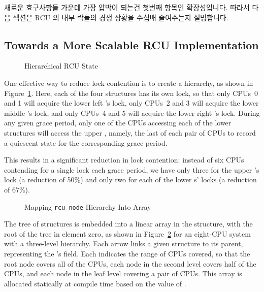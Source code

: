 새로운 효구사항들 가운데 가장 압박이 되는건 첫번째 항목인 확장성입니다.
따라서 다음 섹션은 RCU 의 내부 락들의 경쟁 상황을 수십배 줄여주는지 설명합니다.
\iffalse

The most pressing of the new requirements is the first one, scalability.
The next section therefore describes how to make order-of-magnitude reductions
in contention on RCU's internal locks.
\fi

\subsection{Towards a More Scalable RCU Implementation}
\label{app:rcuimpl:rcutree:Towards a More Scalable RCU Implementation}

\begin{figure}[htb]
\centering
{}
\caption{Hierarchical RCU State}
\label{fig:app:rcuimpl:rcutree:Hierarchical RCU State}
\end{figure}

One effective way to reduce lock contention is to create a hierarchy,
as shown in
Figure~\ref{fig:app:rcuimpl:rcutree:Hierarchical RCU State}.
Here, each of the four  structures has its own lock,
so that only CPUs~0 and 1 will acquire the lower left
's lock, only CPUs~2 and 3 will acquire the
lower middle 's lock, and only CPUs~4 and 5
will acquire the lower right 's lock.
During any given grace period,
only one of the CPUs accessing each of the lower 
structures will access the upper , namely, the
last of each pair of CPUs to record a quiescent state for the corresponding
grace period.

This results in a significant reduction in lock contention:
instead of six CPUs contending for a single lock each grace period,
we have only three for the upper 's lock
(a reduction of 50\%) and only
two for each of the lower s' locks (a reduction
of 67\%).

\begin{figure}[htb]
\centering
{}
\caption{Mapping {\tt rcu\_node} Hierarchy Into Array}
\label{fig:app:rcuimpl:rcutree:Mapping rcu-node Hierarchy Into Array}
\end{figure}

The tree of  structures is embedded into
a linear array in the  structure,
with the root of the tree in element zero, as shown in
Figure~\ref{fig:app:rcuimpl:rcutree:Mapping rcu-node Hierarchy Into Array}
for an eight-CPU
system with a three-level hierarchy.
Each arrow links a given  structure to its parent,
representing the 's  field.
Each  indicates the range of CPUs covered,
so that the root node covers all of the CPUs, each node in the second
level covers half of the CPUs, and each node in the leaf level covering
a pair of CPUs.
This array is allocated statically at compile time based on the value
of .

